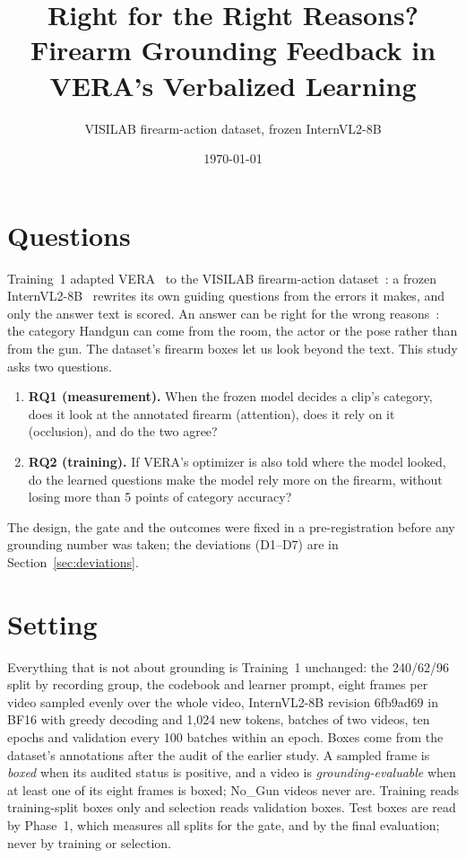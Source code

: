 \documentclass[11pt]{article}
\title{Right for the Right Reasons? Firearm Grounding Feedback in VERA's Verbalized Learning}
\author{VISILAB firearm-action dataset, frozen InternVL2-8B}
\date{\today}
\begin{document}
\maketitle

\begin{abstract}

\end{abstract}

\section{Questions}
Training~1 adapted VERA~\cite{ye2025vera} to the VISILAB firearm-action dataset~\cite{ruizsantaquiteria2024firearm}: a frozen InternVL2-8B~\cite{chen2024internvl15} rewrites its own guiding questions from the errors it makes, and only the answer text is scored. An answer can be right for the wrong reasons~\cite{ross2017right}: the category Handgun can come from the room, the actor or the pose rather than from the gun. The dataset's firearm boxes let us look beyond the text. This study asks two questions.
\begin{enumerate}
\item \textbf{RQ1 (measurement).} When the frozen model decides a clip's category, does it look at the annotated firearm (attention), does it rely on it (occlusion), and do the two agree?
\item \textbf{RQ2 (training).} If VERA's optimizer is also told where the model looked, do the learned questions make the model rely more on the firearm, without losing more than 5 points of category accuracy?
\end{enumerate}
The design, the gate and the outcomes were fixed in a pre-registration before any grounding number was taken; the deviations (D1--D7) are in Section~\ref{sec:deviations}.

\section{Setting}
Everything that is not about grounding is Training~1 unchanged: the 240/62/96 split by recording group, the codebook and learner prompt, eight frames per video sampled evenly over the whole video, InternVL2-8B revision 6fb9ad69 in BF16 with greedy decoding and 1,024 new tokens, batches of two videos, ten epochs and validation every 100 batches within an epoch. Boxes come from the dataset's annotations after the audit of the earlier study. A sampled frame is \emph{boxed} when its audited status is positive, and a video is \emph{grounding-evaluable} when at least one of its eight frames is boxed; No\_Gun videos never are. Training reads training-split boxes only and selection reads validation boxes. Test boxes are read by Phase~1, which measures all splits for the gate, and by the final evaluation; never by training or selection.
\end{document}

